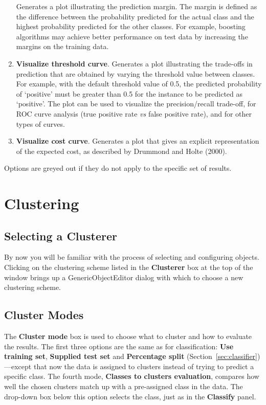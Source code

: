 \documentclass[a4paper]{article}
\begin{document}
\begin{enumerate}
Generates a plot illustrating the prediction margin. The margin is defined as
the difference between the probability predicted for the actual class and the
highest probability predicted for the other classes. For example, boosting
algorithms may achieve better performance on test data by increasing the
margins on the training data. 
\item \textbf{Visualize threshold curve}.
Generates a plot illustrating the trade-offs in prediction that are obtained by
varying the threshold value between classes. For example, with the default
threshold value of 0.5, the predicted probability of `positive' must be greater
than 0.5 for the instance to be predicted as `positive'. The plot can be used
to visualize the precision/recall trade-off, for ROC curve analysis (true
positive rate {\em vs} false positive rate), and for other types of curves. 
\item \textbf{Visualize cost curve}.
Generates a plot that gives an explicit representation of the expected cost, as
described by Drummond and Holte (2000).
\end{enumerate}
\noindent
Options are greyed out if they do not apply to the specific set of results.

\section{Clustering}

\subsection{Selecting a Clusterer}

By now you will be familiar with the process of selecting and configuring
objects.  Clicking on the clustering scheme listed in the \textbf{Clusterer}
box at the top of the window brings up a GenericObjectEditor dialog with which
to choose a new clustering scheme.

\subsection{Cluster Modes}

The \textbf{Cluster mode} box is used to choose what to cluster and how to
evaluate the results. The first three options are the same as for
classification: \textbf{Use training set}, \textbf{Supplied test set} and
\textbf{Percentage split} (Section~\ref{sec:classifier})---except that now the
data is assigned to clusters instead of trying to predict a specific class.
The fourth mode, \textbf{Classes to clusters evaluation}, compares how well the
chosen clusters match up with a pre-assigned class in the data.  The drop-down
box below this option selects the class, just as in the \textbf{Classify}
panel.
\end{document}
